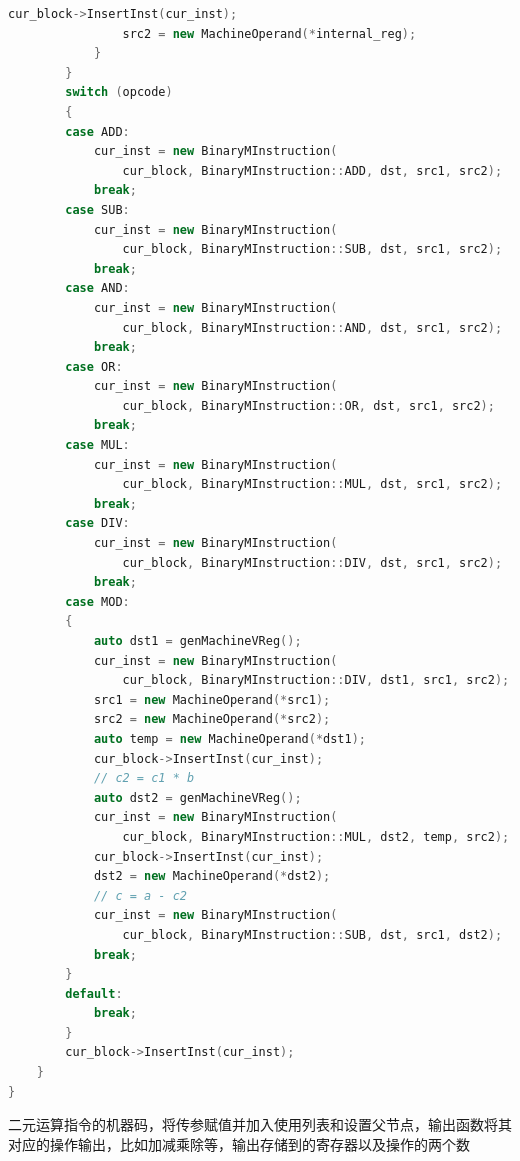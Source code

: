 \documentclass[UTF8,a4paper,10pt]{ctexart}
\begin{document}
\begin{lstlisting}[title = 生成目标代码, language = c++]
                cur_block->InsertInst(cur_inst);
                src2 = new MachineOperand(*internal_reg);
            }
        }
        switch (opcode)
        {
        case ADD:
            cur_inst = new BinaryMInstruction(
                cur_block, BinaryMInstruction::ADD, dst, src1, src2);
            break;
        case SUB:
            cur_inst = new BinaryMInstruction(
                cur_block, BinaryMInstruction::SUB, dst, src1, src2);
            break;
        case AND:
            cur_inst = new BinaryMInstruction(
                cur_block, BinaryMInstruction::AND, dst, src1, src2);
            break;
        case OR:
            cur_inst = new BinaryMInstruction(
                cur_block, BinaryMInstruction::OR, dst, src1, src2);
            break;
        case MUL:
            cur_inst = new BinaryMInstruction(
                cur_block, BinaryMInstruction::MUL, dst, src1, src2);
            break;
        case DIV:
            cur_inst = new BinaryMInstruction(
                cur_block, BinaryMInstruction::DIV, dst, src1, src2);
            break;
        case MOD:
        {
            auto dst1 = genMachineVReg();
            cur_inst = new BinaryMInstruction(
                cur_block, BinaryMInstruction::DIV, dst1, src1, src2);
            src1 = new MachineOperand(*src1);
            src2 = new MachineOperand(*src2);
            auto temp = new MachineOperand(*dst1);
            cur_block->InsertInst(cur_inst);
            // c2 = c1 * b
            auto dst2 = genMachineVReg();
            cur_inst = new BinaryMInstruction(
                cur_block, BinaryMInstruction::MUL, dst2, temp, src2);
            cur_block->InsertInst(cur_inst);
            dst2 = new MachineOperand(*dst2);
            // c = a - c2
            cur_inst = new BinaryMInstruction(
                cur_block, BinaryMInstruction::SUB, dst, src1, dst2);
            break;
        }
        default:
            break;
        }
        cur_block->InsertInst(cur_inst);
    }
}
\end{lstlisting}
二元运算指令的机器码，将传参赋值并加入使用列表和设置父节点，输出函数将其对应的操作输出，比如加减乘除等，输出存储到的寄存器以及操作的两个数
\end{document}
